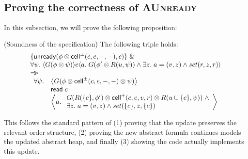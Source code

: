 \subsection{Proving the correctness of \textsc{AUnready}}

In this subsection, we will prove the following proposition:

\begin{prop*}{(Soundness of the  specification)}
The following triple holds:
\begin{displaymath}
\begin{array}{l}
\{{\mathsf{unready}({\phi \otimes \mathsf{cell}^{\pm}({c}, {e}, {-}, {-})}, {c})}\} \;\&\; \\
\forall \psi.\; \langle{G(\phi \otimes \psi)}\rangle{e}\langle{a}.\;{G(\phi' \otimes R(u, \psi)) \land \exists z.\; a = (v, z) \land \mathit{set}(r, z, r)}\rangle \\
\Rightarrow\!\!\!> \\
\begin{array}{ll}
 \forall \psi. & \left<G(\phi \otimes \mathsf{cell}^{\pm}({c}, {e}, {-}, {-}) \otimes \psi)\right> \\
               & \mathsf{read}\; c \\
               & \left<a.\; 
                   \begin{array}{l}
                     G(R(\{{c}\}, \phi') \otimes \mathsf{cell}^{+}({c}, {e}, {v}, {r}) \otimes R(u \cup \{{c}\}, \psi)) 
                      \;\land \\
                      \exists z.\;a = (v, z) \land \mathit{set}(\{{c}\}, z, \{{c}\})
                   \end{array}\right> 
\end{array}
\end{array}
\end{displaymath}
\end{prop*}

This follows the standard pattern of (1) proving that the update
preserves the relevant order structure, (2) proving the new abstract
formula continues models the updated abstract heap, and finally (3)
showing the code actually implements this update. 


